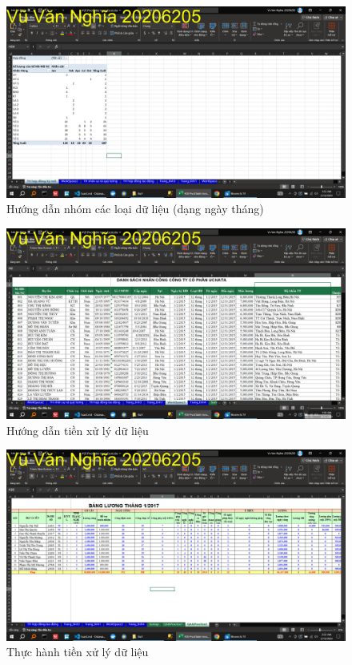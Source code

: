 \documentclass{article}
\begin{document}
\begin{figure}[H]
    \centering
    \includegraphics[scale = 0.15]{Bai1/HuongDan/8.png}
    \caption{Hướng dẫn nhóm các loại dữ liệu (dạng ngày tháng)}
\end{figure}



\begin{figure}[H]
    \centering
    \includegraphics[scale = 0.15]{Bai1/HuongDan/9.png}
    \caption{Hướng dẫn tiền xử lý dữ liệu}
\end{figure}



\begin{figure}[H]
    \centering
    \includegraphics[scale = 0.15]{Bai1/ThucHanh/0.png}
    \caption{Thực hành tiền xử lý dữ liệu}
\end{figure}
\end{document}
